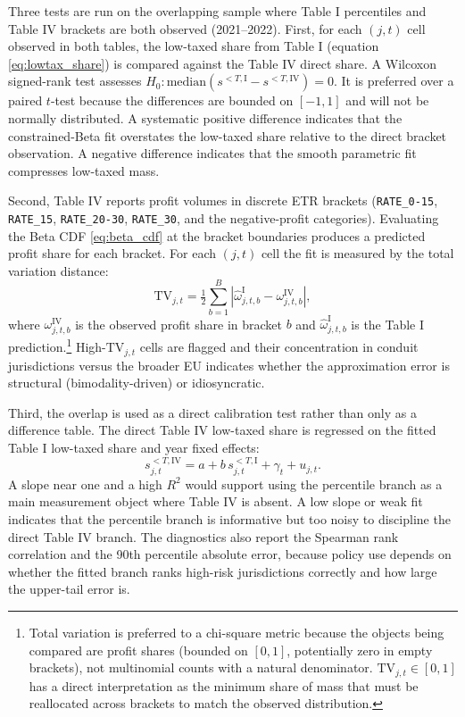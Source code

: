 \documentclass[11pt,a4paper]{article}
\newcommand{\code}[1]{\texttt{#1}}
\begin{document}
Three tests are run on the overlapping sample where Table I percentiles and Table IV brackets are both observed (2021--2022). First, for each $(j, t)$ cell observed in both tables, the low-taxed share from Table I (equation \ref{eq:lowtax_share}) is compared against the Table IV direct share. A Wilcoxon signed-rank test assesses $H_0\colon \text{median}(s^{<T,\text{I}} - s^{<T,\text{IV}}) = 0$. It is preferred over a paired $t$-test because the differences are bounded on $[-1, 1]$ and will not be normally distributed. A systematic positive difference indicates that the constrained-Beta fit overstates the low-taxed share relative to the direct bracket observation. A negative difference indicates that the smooth parametric fit compresses low-taxed mass.

Second, Table IV reports profit volumes in discrete ETR brackets (\code{RATE\_0-15}, \code{RATE\_15}, \code{RATE\_20-30}, \code{RATE\_30}, and the negative-profit categories). Evaluating the Beta CDF \eqref{eq:beta_cdf} at the bracket boundaries produces a predicted profit share for each bracket. For each $(j, t)$ cell the fit is measured by the total variation distance:
\begin{equation}\label{eq:chisq_crossval}
\text{TV}_{j,t} = \tfrac{1}{2}\sum_{b=1}^{B} \left|\hat{\omega}_{j,t,b}^{\text{I}} - \omega_{j,t,b}^{\text{IV}}\right|,
\end{equation}
where $\omega_{j,t,b}^{\text{IV}}$ is the observed profit share in bracket $b$ and $\hat{\omega}_{j,t,b}^{\text{I}}$ is the Table I prediction.\footnote{Total variation is preferred to a chi-square metric because the objects being compared are profit shares (bounded on $[0, 1]$, potentially zero in empty brackets), not multinomial counts with a natural denominator. $\text{TV}_{j,t} \in [0, 1]$ has a direct interpretation as the minimum share of mass that must be reallocated across brackets to match the observed distribution.} High-$\text{TV}_{j,t}$ cells are flagged and their concentration in conduit jurisdictions versus the broader EU indicates whether the approximation error is structural (bimodality-driven) or idiosyncratic.

Third, the overlap is used as a direct calibration test rather than only as a difference table. The direct Table IV low-taxed share is regressed on the fitted Table I low-taxed share and year fixed effects:
\begin{equation}\label{eq:crossval_calibration}
s_{j,t}^{<T,\text{IV}} = a + b\,s_{j,t}^{<T,\text{I}} + \gamma_t + u_{j,t}.
\end{equation}
A slope near one and a high $R^2$ would support using the percentile branch as a main measurement object where Table IV is absent. A low slope or weak fit indicates that the percentile branch is informative but too noisy to discipline the direct Table IV branch. The diagnostics also report the Spearman rank correlation and the 90th percentile absolute error, because policy use depends on whether the fitted branch ranks high-risk jurisdictions correctly and how large the upper-tail error is.
\end{document}

